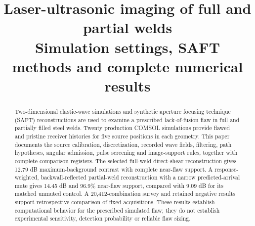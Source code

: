 \documentclass[11pt]{article}
\title{Laser-ultrasonic imaging of full and partial welds\\[.4em]\large Simulation settings, SAFT methods and complete numerical results}
\author{}
\date{}
\begin{document}
\pagestyle{plain}
\maketitle
\begin{abstract}
Two-dimensional elastic-wave simulations and synthetic aperture focusing technique (SAFT) reconstructions are used to examine a prescribed lack-of-fusion flaw in full and partially filled steel welds. Twenty production COMSOL simulations provide flawed and pristine receiver histories for five source positions in each geometry. This paper documents the source calibration, discretization, recorded wave fields, filtering, path hypotheses, angular admission, pulse screening and image-support rules, together with complete comparison registers. The selected full-weld direct-shear reconstruction gives 12.79 dB maximum-background contrast with complete near-flaw support. A response-weighted, backwall-reflected partial-weld reconstruction with a narrow predicted-arrival mute gives 14.45 dB and 96.9\% near-flaw support, compared with 9.09 dB for its matched unmuted control. A 20,412-combination survey and retained negative results support retrospective comparison of fixed acquisitions. These results establish computational behavior for the prescribed simulated flaw; they do not establish experimental sensitivity, detection probability or reliable flaw sizing.
\end{abstract}
\end{document}
